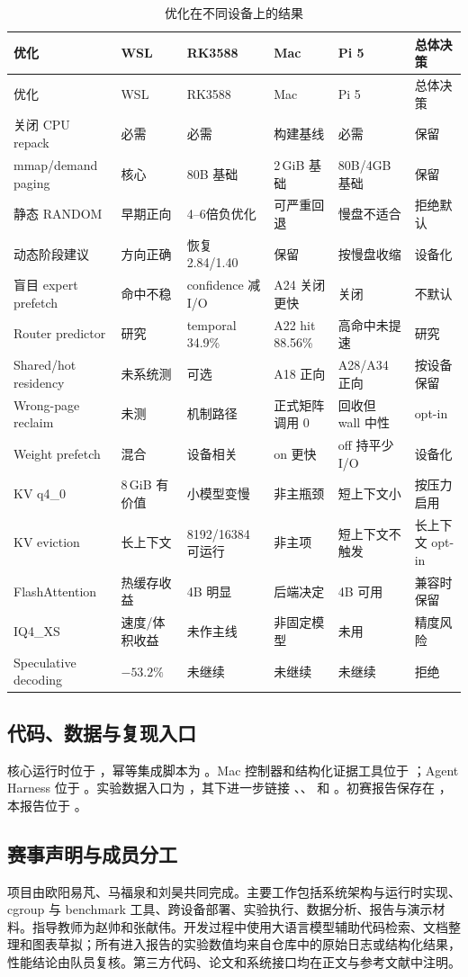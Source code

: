 \begin{longtable}{p{}p{}p{}p{}p{}p{}}
  \caption{优化在不同设备上的结果}\label{tab:appendix-decision-ledger}\\
  \toprule 优化 & WSL & RK3588 & Mac & Pi 5 & 总体决策 \\
  \midrule
  \endfirsthead
  \toprule 优化 & WSL & RK3588 & Mac & Pi 5 & 总体决策 \\
  \midrule
  \endhead
  关闭 CPU repack & 必需 & 必需 & 构建基线 & 必需 & 保留 \\
  mmap/demand paging & 核心 & 80B 基础 & 2\,GiB 基础 & 80B/4GB 基础 & 保留 \\
  静态 RANDOM & 早期正向 & 4--6倍负优化 & 可严重回退 & 慢盘不适合 & 拒绝默认 \\
  动态阶段建议 & 方向正确 & 恢复 2.84/1.40 & 保留 & 按慢盘收缩 & 设备化 \\
  盲目 expert prefetch & 命中不稳 & confidence 减 I/O & A24 关闭更快 & 关闭 & 不默认 \\
  Router predictor & 研究 & temporal 34.9\% & A22 hit 88.56\% & 高命中未提速 & 研究 \\
  Shared/hot residency & 未系统测 & 可选 & A18 正向 & A28/A34 正向 & 按设备保留 \\
  Wrong-page reclaim & 未测 & 机制路径 & 正式矩阵调用 0 & 回收但 wall 中性 & opt-in \\
  Weight prefetch & 混合 & 设备相关 & on 更快 & off 持平少 I/O & 设备化 \\
  KV q4\_0 & 8\,GiB 有价值 & 小模型变慢 & 非主瓶颈 & 短上下文小 & 按压力启用 \\
  KV eviction & 长上下文 & 8192/16384 可运行 & 非主项 & 短上下文不触发 & 长上下文 opt-in \\
  FlashAttention & 热缓存收益 & 4B 明显 & 后端决定 & 4B 可用 & 兼容时保留 \\
  IQ4\_XS & 速度/体积收益 & 未作主线 & 非固定模型 & 未用 & 精度风险 \\
  Speculative decoding & $-53.2\%$ & 未继续 & 未继续 & 未继续 & 拒绝 \\
  \bottomrule
\end{longtable}

\subsection{代码、数据与复现入口}

核心运行时位于 ，幂等集成脚本为 。Mac 控制器和结构化证据工具位于 ；Agent Harness 位于 。实验数据入口为 ，其下进一步链接 、、 和 。初赛报告保存在 ，本报告位于 。

\subsection{赛事声明与成员分工}

项目由欧阳易芃、马福泉和刘昊共同完成。主要工作包括系统架构与运行时实现、cgroup 与 benchmark 工具、跨设备部署、实验执行、数据分析、报告与演示材料。指导教师为赵帅和张献伟。开发过程中使用大语言模型辅助代码检索、文档整理和图表草拟；所有进入报告的实验数值均来自仓库中的原始日志或结构化结果，性能结论由队员复核。第三方代码、论文和系统接口均在正文与参考文献中注明。

